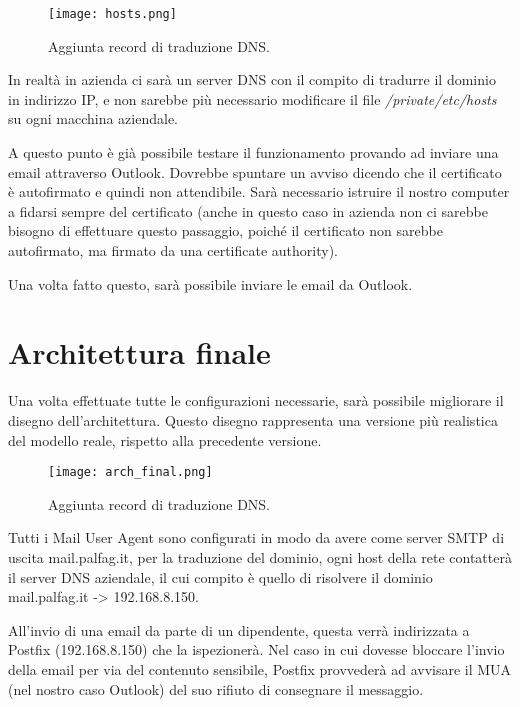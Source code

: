     \begin{figure}[htp]
        \centering
        \texttt{[image: hosts.png]}
        \caption{Aggiunta record di traduzione DNS.}\label{hosts}
    \end{figure}  

    In realtà in azienda ci sarà un server DNS con il compito di tradurre il dominio in indirizzo IP, 
    e non sarebbe più necessario modificare il file \textit{/private/etc/hosts} su ogni macchina aziendale.


    A questo punto è già possibile testare il funzionamento provando ad inviare una email attraverso Outlook. 
    Dovrebbe spuntare un avviso dicendo che il certificato è autofirmato e quindi non attendibile. 
    Sarà necessario istruire il nostro computer a fidarsi sempre del certificato
    (anche in questo caso in azienda non ci sarebbe bisogno di effettuare questo passaggio, poiché 
    il certificato non sarebbe autofirmato, ma firmato da una certificate authority).

    Una volta fatto questo, sarà possibile inviare le email da Outlook.


    \section{Architettura finale}
    Una volta effettuate tutte le configurazioni necessarie, sarà possibile migliorare il disegno dell’architettura. 
    Questo disegno rappresenta una versione più realistica del modello reale, rispetto alla precedente versione.

    \begin{figure}[htp]
        \centering
        \texttt{[image: arch\_final.png]}
        \caption{Aggiunta record di traduzione DNS.}\label{hosts}
    \end{figure} 

    Tutti i Mail User Agent sono configurati in modo da avere come server SMTP di uscita mail.palfag.it, 
    per la traduzione del dominio, ogni host della rete contatterà il server DNS aziendale, il cui compito è
    quello di risolvere il dominio mail.palfag.it -> 192.168.8.150.

    All'invio di una email da parte di un dipendente, questa verrà indirizzata a Postfix (192.168.8.150) che la 
    ispezionerà. Nel caso in cui dovesse bloccare l’invio della email per via del contenuto sensibile, 
    Postfix provvederà ad avvisare il MUA (nel nostro caso Outlook) del suo rifiuto di consegnare il messaggio.

